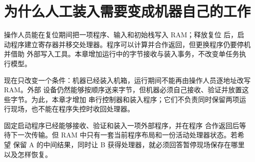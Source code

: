 \chapter{为什么人工装入需要变成机器自己的工作}

\begin{keyidea}
操作人员能在复位期间把一项程序、输入和初始栈写入 RAM；释放复位
后，启动程序建立寄存器并移交处理器。程序可以计算并合作返回，但更换程序仍要停机并借助
外部写入工具。本章增加运行中的字节接收与装入事务，不改变单任务执行模型。
\end{keyidea}

现在只改变一个条件：机器已经装入机箱，运行期间不能再由操作人员逐地址改写 RAM。外部
设备仍然能够按顺序送来字节，但机器必须自己接收、验证并放置这些字节。为此，本章才增加
串行控制器和装入程序；它们不负责同时保留两项运行现场，也不能在程序失控时收回处理器。











固定启动程序已经能够接收、验证和装入一项外部程序，并在程序
合作返回后等待下一次传输。但 RAM 中只有一套当前程序布局和一份活动处理器状态。若希望
保留 A 的中间结果，同时让 B 获得处理器，就必须回答暂停现场保存在哪里以及怎样恢复。
